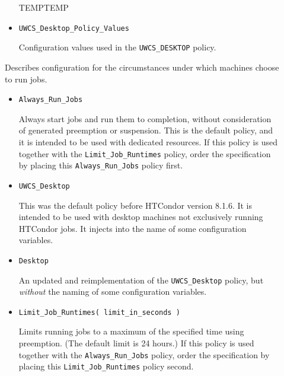 \begin{description}
\begin{itemize}
	TEMPTEMP


    \item \texttt{UWCS\_Desktop\_Policy\_Values}

	Configuration values used in the \texttt{UWCS\_DESKTOP} policy.
  \end{itemize}

\label{usecategory:POLICY}
\item[\MacroNI{POLICY category}]
  Describes configuration for the circumstances under which
  machines choose to run jobs.
  \begin{itemize}

    \item \texttt{Always\_Run\_Jobs}

    Always start jobs and run them to completion, without consideration of
     generated preemption or suspension.
    This is the default policy, and it is intended to be used with dedicated
    resources.
    If this policy is used together with the \texttt{Limit\_Job\_Runtimes}
    policy,
    order the specification by placing this \texttt{Always\_Run\_Jobs} 
    policy first. 

    \item \texttt{UWCS\_Desktop}

    This was the default policy before HTCondor version 8.1.6.
    It is intended to be used with desktop machines not exclusively running
    HTCondor jobs.
    It injects  into the name of some configuration variables.

    \item \texttt{Desktop}

    An updated and reimplementation of the \texttt{UWCS\_Desktop} policy,
    but \emph{without} the  naming of some configuration variables.

    \item \texttt{Limit\_Job\_Runtimes( limit\_in\_seconds )}

    Limits running jobs to a maximum of the specified time using preemption.
	(The default limit is 24 hours.)
    If this policy is used together with the \texttt{Always\_Run\_Jobs} policy,
    order the specification by placing this \texttt{Limit\_Job\_Runtimes} 
    policy second. 


\end{itemize}
\end{description}
